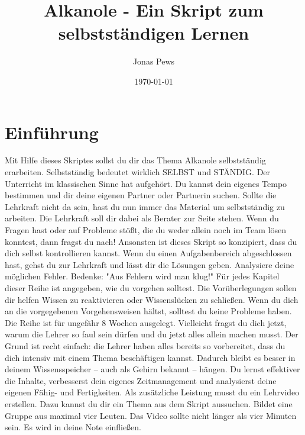 \documentclass{scrartcl}  %
\author{Jonas Pews}
\title{Alkanole - Ein Skript zum selbstständigen Lernen}
\date{\today}
\begin{document}
	\maketitle
	
	\begin{center}
		\ccbyncsa
	\end{center}
	

\pagebreak

	\tableofcontents

\pagebreak
	
		
		\section{Einführung}
	
			Mit Hilfe dieses Skriptes sollst du dir das Thema Alkanole selbstständig erarbeiten. Selbstständig bedeutet wirklich SELBST und STÄNDIG. Der Unterricht im klassischen Sinne hat aufgehört. Du kannst dein eigenes Tempo bestimmen und dir deine eigenen Partner oder Partnerin suchen. Sollte die Lehrkraft nicht da sein, hast du nun immer das Material um selbstständig zu arbeiten.
			Die Lehrkraft soll dir dabei als Berater zur Seite stehen. Wenn du Fragen hast oder auf Probleme stößt, die du weder allein noch im Team lösen konntest, dann fragst du nach!
			Ansonsten ist dieses Skript so konzipiert, dass du dich selbst kontrollieren kannst. Wenn du einen Aufgabenbereich abgeschlossen hast, gehst du zur Lehrkraft und lässt dir die Lösungen geben. Analysiere deine möglichen Fehler. Bedenke: "Aus Fehlern wird man klug!"
			Für jedes Kapitel dieser Reihe ist angegeben, wie du vorgehen solltest. Die Vorüberlegungen sollen dir helfen Wissen zu reaktivieren oder Wissenslücken zu schließen. Wenn du dich an die vorgegebenen Vorgehensweisen hältst, solltest du keine Probleme haben.
			Die Reihe ist für ungefähr 8 Wochen ausgelegt.
			Vielleicht fragst du dich jetzt, warum die Lehrer so faul sein dürfen und du jetzt alles allein machen musst. Der Grund ist recht einfach: die Lehrer haben alles bereits so vorbereitet, dass du dich intensiv mit einem Thema beschäftigen kannst. Dadurch bleibt es besser in deinem Wissensspeicher – auch als Gehirn bekannt – hängen. Du lernst effektiver die Inhalte, verbesserst dein eigenes Zeitmanagement und analysierst deine eigenen Fähig- und Fertigkeiten.
			Als zusätzliche Leistung musst du ein Lehrvideo erstellen. Dazu kannst du dir ein Thema aus dem Skript aussuchen. Bildet eine Gruppe aus maximal vier Leuten. Das Video sollte nicht länger als vier Minuten sein. Es wird in deine Note einfließen.
	
\end{document}
